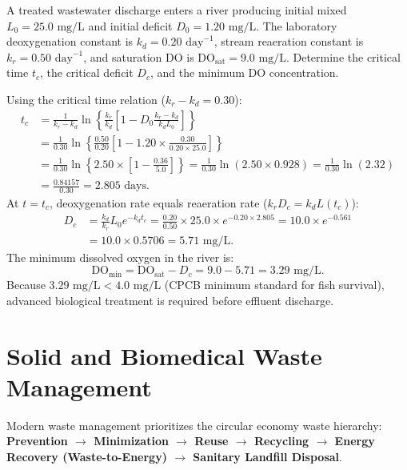 \begin{example}
A treated wastewater discharge enters a river producing initial mixed $L_0 = 25.0\text{ mg/L}$ and initial deficit $D_0 = 1.20\text{ mg/L}$. The laboratory deoxygenation constant is $k_d = 0.20\text{ day}^{-1}$, stream reaeration constant is $k_r = 0.50\text{ day}^{-1}$, and saturation DO is $\text{DO}_{\text{sat}} = 9.0\text{ mg/L}$. Determine the critical time $t_c$, the critical deficit $D_c$, and the minimum DO concentration.
\end{example}

\begin{solutionbox}
Using the critical time relation ($k_r - k_d = 0.30$):
\begin{align*}
t_c &= \frac{1}{k_r - k_d} \ln\left\{ \frac{k_r}{k_d} \left[ 1 - D_0 \frac{k_r - k_d}{k_d L_0} \right] \right\} \\
&= \frac{1}{0.30} \ln\left\{ \frac{0.50}{0.20} \left[ 1 - 1.20 \times \frac{0.30}{0.20 \times 25.0} \right] \right\} \\
&= \frac{1}{0.30} \ln\left\{ 2.50 \times \left[ 1 - \frac{0.36}{5.0} \right] \right\} = \frac{1}{0.30} \ln(2.50 \times 0.928) = \frac{1}{0.30} \ln(2.32) \\
&= \frac{0.84157}{0.30} = 2.805\text{ days}.
\end{align*}
At $t = t_c$, deoxygenation rate equals reaeration rate ($k_r D_c = k_d L(t_c)$):
\begin{align*}
D_c &= \frac{k_d}{k_r} L_0 e^{-k_d t_c} = \frac{0.20}{0.50} \times 25.0 \times e^{-0.20 \times 2.805} = 10.0 \times e^{-0.561} \\
&= 10.0 \times 0.5706 = 5.71\text{ mg/L}.
\end{align*}
The minimum dissolved oxygen in the river is:
\begin{equation*}
\text{DO}_{\text{min}} = \text{DO}_{\text{sat}} - D_c = 9.0 - 5.71 = 3.29\text{ mg/L}.
\end{equation*}
Because $3.29\text{ mg/L} < 4.0\text{ mg/L}$ (CPCB minimum standard for fish survival), advanced biological treatment is required before effluent discharge.
\end{solutionbox}

\section{Solid and Biomedical Waste Management}
Modern waste management prioritizes the circular economy waste hierarchy:
\textbf{Prevention $\to$ Minimization $\to$ Reuse $\to$ Recycling $\to$ Energy Recovery (Waste-to-Energy) $\to$ Sanitary Landfill Disposal}.


